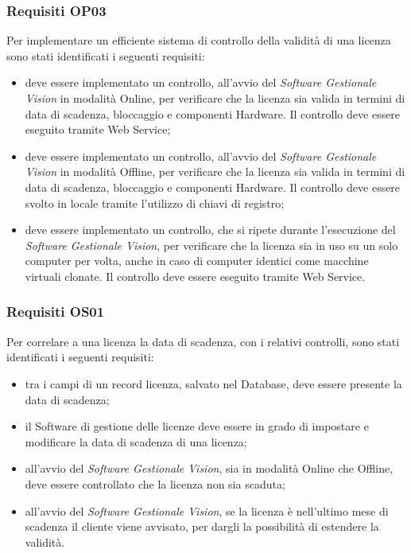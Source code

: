 \subsubsection{Requisiti OP03}

Per implementare un efficiente sistema di controllo della validità di una licenza sono stati identificati i seguenti requisiti:

\begin{itemize}
\item deve essere implementato un controllo, all'avvio del \textit{Software Gestionale Vision} in modalità Online, per verificare che la licenza sia valida in termini di data di scadenza, bloccaggio e componenti Hardware. Il controllo deve essere eseguito tramite Web Service; 
\item deve essere implementato un controllo, all'avvio del \textit{Software Gestionale Vision} in modalità Offline, per verificare che la licenza sia valida in termini di data di scadenza, bloccaggio e componenti Hardware. Il controllo deve essere svolto in locale tramite l'utilizzo di chiavi di registro;
\item deve essere implementato un controllo, che si ripete durante l'esecuzione del \textit{Software Gestionale Vision}, per verificare che la licenza sia in uso su un solo computer per volta, anche in caso di computer identici come macchine virtuali clonate. Il controllo deve essere eseguito tramite Web Service.
\end{itemize}

\subsubsection{Requisiti OS01}

Per correlare a una licenza la data di scadenza, con i relativi controlli, sono stati identificati i seguenti requisiti:

\begin{itemize}
\item tra i campi di un record licenza, salvato nel Database, deve essere presente la data di scadenza;
\item il Software di gestione delle licenze deve essere in grado di impostare e modificare la data di scadenza di una licenza;
\item all'avvio del \textit{Software Gestionale Vision}, sia in modalità Online che Offline, deve essere controllato che la licenza non sia scaduta;
\item all'avvio del \textit{Software Gestionale Vision}, se la licenza è nell'ultimo mese di scadenza il cliente viene avvisato, per dargli la possibilità di estendere la validità.
\end{itemize}

